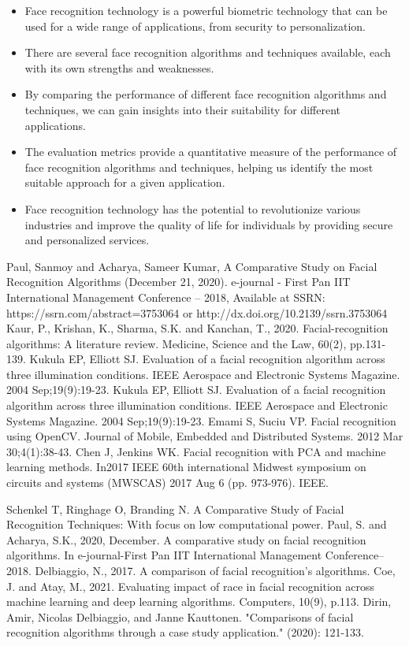 \documentclass[openany]{report}
\begin{document}
\begin{itemize}
    \item Face recognition technology is a powerful biometric technology that can be used for a wide range of applications, from security to personalization.
    \item There are several face recognition algorithms and techniques available, each with its own strengths and weaknesses.
    \item By comparing the performance of different face recognition algorithms and techniques, we can gain insights into their suitability for different applications.
    \item The evaluation metrics provide a quantitative measure of the performance of face recognition algorithms and techniques, helping us identify the most suitable approach for a given application.
    \item Face recognition technology has the potential to revolutionize various industries and improve the quality of life for individuals by providing secure and personalized services.
\end{itemize}
\clearpage
\begin{thebibliography}{10}
    Paul, Sanmoy and Acharya, Sameer Kumar, A Comparative Study on Facial Recognition Algorithms (December 21, 2020). e-journal - First Pan IIT International Management Conference – 2018, Available at SSRN: https://ssrn.com/abstract=3753064 or http://dx.doi.org/10.2139/ssrn.3753064
    Kaur, P., Krishan, K., Sharma, S.K. and Kanchan, T., 2020. Facial-recognition algorithms: A literature review. Medicine, Science and the Law, 60(2), pp.131-139.
    Kukula EP, Elliott SJ. Evaluation of a facial recognition algorithm across three illumination conditions. IEEE Aerospace and Electronic Systems Magazine. 2004 Sep;19(9):19-23.
    Kukula EP, Elliott SJ. Evaluation of a facial recognition algorithm across three illumination conditions. IEEE Aerospace and Electronic Systems Magazine. 2004 Sep;19(9):19-23.
    Emami S, Suciu VP. Facial recognition using OpenCV. Journal of Mobile, Embedded and Distributed Systems. 2012 Mar 30;4(1):38-43.
    Chen J, Jenkins WK. Facial recognition with PCA and machine learning methods. In2017 IEEE 60th international Midwest symposium on circuits and systems (MWSCAS) 2017 Aug 6 (pp. 973-976). IEEE.

    Schenkel T, Ringhage O, Branding N. A Comparative Study of Facial Recognition Techniques: With focus on low computational power.
    Paul, S. and Acharya, S.K., 2020, December. A comparative study on facial recognition algorithms. In e-journal-First Pan IIT International Management Conference–2018.
    Delbiaggio, N., 2017. A comparison of facial recognition’s algorithms.
    Coe, J. and Atay, M., 2021. Evaluating impact of race in facial recognition across machine learning and deep learning algorithms. Computers, 10(9), p.113.
    Dirin, Amir, Nicolas Delbiaggio, and Janne Kauttonen. "Comparisons of facial recognition algorithms through a case study application." (2020): 121-133.

\end{thebibliography}
\end{document}
